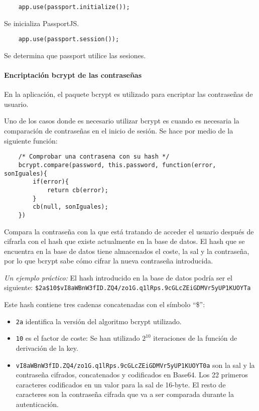 \medskip
\begin{lstlisting}
	app.use(passport.initialize());
\end{lstlisting}


Se inicializa PassportJS.


\medskip
\begin{lstlisting}
	app.use(passport.session());
\end{lstlisting}


Se determina que passport utilice las sesiones.


\paragraph*{Encriptación bcrypt de las contraseñas}
En la aplicación, el paquete bcrypt es utilizado para encriptar las contraseñas de usuario.


Uno de los casos donde es necesario utilizar bcrypt es cuando es necesaria la comparación de contraseñas en el inicio de sesión. Se hace por medio de la siguiente función:


\medskip
\begin{lstlisting}
	/* Comprobar una contrasena con su hash */ 
	bcrypt.compare(password, this.password, function(error, sonIguales){ 
		if(error){ 
			return cb(error); 
		} 
		cb(null, sonIguales); 
	}) 
\end{lstlisting}

Compara la contraseña con la que está tratando de acceder el usuario después de cifrarla con el hash que existe actualmente en la base de datos. El hash que se encuentra en la base de datos tiene almacenados el coste, la sal y la contraseña, por lo que bcrypt sabe cómo cifrar la nueva contraseña introducida.


\textit{Un ejemplo práctico:}
El hash introducido en la base de datos podría ser el siguiente:
\texttt{\$2a\$10\$vI8aWBnW3fID.ZQ4/zo1G.q1lRps.9cGLcZEiGDMVr5yUP1KUOYTa}


Este hash contiene tres cadenas concatenadas con el símbolo ``\$'':
\begin{itemize}
\item \texttt{2a} identifica la versión del algoritmo bcrypt utilizado.
\item \texttt{10} es el factor de coste: Se han utilizado $2^{10}$ iteraciones de la función de derivación de la key.
\item \texttt{vI8aWBnW3fID.ZQ4/zo1G.q1lRps.9cGLcZEiGDMVr5yUP1KUOYT0a} son la sal y la contraseña cifrados, concatenados y codificados en Base64. Los 22 primeros caracteres codificados en un valor para la sal de 16-byte. El resto de caracteres son la contraseña cifrada que va a ser comparada durante la autenticación.
\end{itemize}



